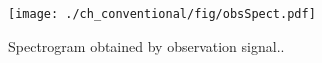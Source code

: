 \documentclass[honka]{nitkagawathesis}%
\begin{document}
\begin{figure}[tb]
\centering
\texttt{[image: ./ch\_conventional/fig/obsSpect.pdf]}
\caption{Spectrogram obtained by observation signal..}
\label{fig:obsspect}
\end{figure}

\appendix

%
\end{document}
